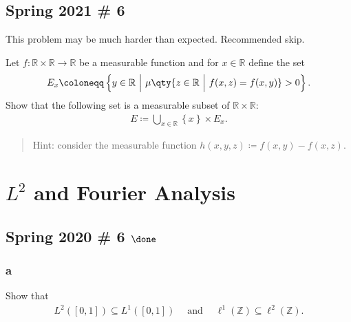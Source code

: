 \hypertarget{spring-2021-6}{%
\subsection{Spring 2021 \# 6}\label{spring-2021-6}}

\begin{warnings}

This problem may be much harder than expected. Recommended skip.

\end{warnings}

Let \(f: {\mathbb{R}}\times{\mathbb{R}}\to {\mathbb{R}}\) be a
measurable function and for \(x\in {\mathbb{R}}\) define the set
\begin{align*}
E_x \coloneqq\left\{{ y\in {\mathbb{R}}{~\mathrel{\Big|}~}\mu\qty{ z\in {\mathbb{R}}{~\mathrel{\Big|}~}f(x,z) = f(x, y) } > 0 }\right\} 
.\end{align*}
Show that the following set is a measurable subset of
\({\mathbb{R}}\times{\mathbb{R}}\):
\begin{align*}
E \coloneqq\bigcup_{x\in {\mathbb{R}}} \left\{{ x }\right\} \times E_x
.\end{align*}

\begin{quote}
Hint: consider the measurable function
\(h(x,y,z) \coloneqq f(x, y) - f(x, z)\).
\end{quote}

\hypertarget{l2-and-fourier-analysis}{%
\section{\texorpdfstring{\(L^2\) and Fourier
Analysis}{L\^{}2 and Fourier Analysis}}\label{l2-and-fourier-analysis}}

\hypertarget{spring-2020-6-done}{%
\subsection{\texorpdfstring{Spring 2020 \# 6
\(\done\)}{Spring 2020 \# 6 \textbackslash done}}\label{spring-2020-6-done}}

\hypertarget{a-11}{%
\subsubsection{a}\label{a-11}}

Show that
\begin{align*}
L^2([0, 1]) \subseteq L^1([0, 1]) {\quad \operatorname{and} \quad} \ell^1({\mathbb{Z}}) \subseteq \ell^2({\mathbb{Z}})
.\end{align*}

